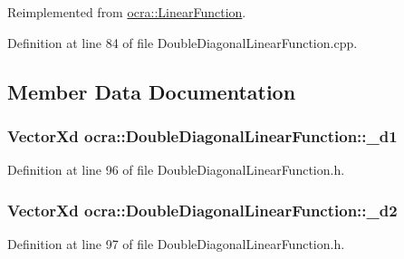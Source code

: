 Reimplemented from \hyperlink{classocra_1_1LinearFunction_a1866f014864a272dc01c4d81d3a5fe03}{ocra\+::\+Linear\+Function}.



Definition at line 84 of file Double\+Diagonal\+Linear\+Function.\+cpp.



\subsection{Member Data Documentation}
\subsubsection[{\texorpdfstring{\+\_\+d1}{_d1}}]{\setlength{\rightskip}{0pt plus 5cm}Vector\+Xd ocra\+::\+Double\+Diagonal\+Linear\+Function\+::\+\_\+d1\hspace{0.3cm}{\ttfamily [protected]}}\hypertarget{classocra_1_1DoubleDiagonalLinearFunction_aff7e6eb0c3c53e0799909ab76d279d0a}{}\label{classocra_1_1DoubleDiagonalLinearFunction_aff7e6eb0c3c53e0799909ab76d279d0a}


Definition at line 96 of file Double\+Diagonal\+Linear\+Function.\+h.

\subsubsection[{\texorpdfstring{\+\_\+d2}{_d2}}]{\setlength{\rightskip}{0pt plus 5cm}Vector\+Xd ocra\+::\+Double\+Diagonal\+Linear\+Function\+::\+\_\+d2\hspace{0.3cm}{\ttfamily [protected]}}\hypertarget{classocra_1_1DoubleDiagonalLinearFunction_a043b9a5dba8b0d42b00deed8898c1843}{}\label{classocra_1_1DoubleDiagonalLinearFunction_a043b9a5dba8b0d42b00deed8898c1843}


Definition at line 97 of file Double\+Diagonal\+Linear\+Function.\+h.


